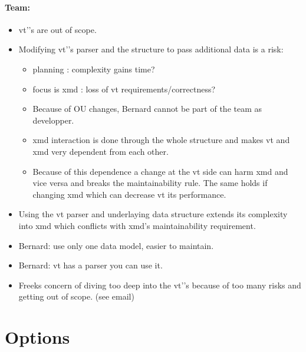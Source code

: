 \documentclass[a4paper,11pt,final]{article}
\begin{document}
\paragraph{Team:}
\begin{itemize}
\item vt'’s are out of scope.
\item Modifying vt'’s parser and the structure to pass additional data is a risk:
	\begin{itemize}
	\item planning : complexity gains time?
	\item focus is xmd : loss of vt requirements/correctness?
	\item Because of OU changes, Bernard cannot be part of the team as developper.
	\item xmd interaction is done through the whole structure and makes vt and xmd very dependent from each other.
	\item Because of this dependence a change at the vt side can harm xmd and vice versa and breaks the maintainability rule.
		The same holds if changing xmd which can decrease vt its performance. 
	\end{itemize}
\item	Using the vt parser and underlaying data structure extends its complexity
	into xmd which conflicts with xmd's maintainability requirement.
\item Bernard: use only one data model, easier to maintain.
\item Bernard: vt has a parser you can use it.
\item Freeks concern of diving too deep into the vt'’s because of too many risks and getting out of scope. (see email)
\end{itemize}

\section{Options}
\paragraph{}
\end{document}
